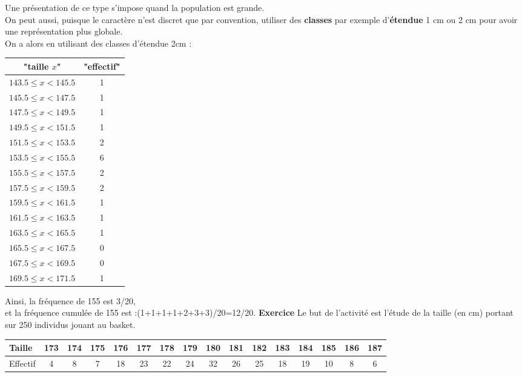 \documentclass[a4paper,11pt]{book}
\begin{document}
Une pr\'esentation de ce type s'impose quand la population est grande.\\
On peut aussi, puisque le caract\`ere n'est discret que par convention, 
utiliser des {\bf classes} par exemple d'{\bf \'etendue}  1 cm ou 2 cm pour 
avoir une repr\'esentation plus globale.\\ 
On a alors en utilisant des classes d'\'etendue 2cm :\\
\begin{center}
\begin{tabular}{|c|c|}
\hline
"taille $x$"&"effectif"\\
\hline
$143.5 \leq x< 145.5$&1\\
$145.5 \leq x <147.5$&1\\
$147.5 \leq x <149.5$&1\\
$149.5 \leq x <151.5$&1\\
$151.5 \leq x <153.5$&2\\
$153.5 \leq x <155.5$&6\\
$155.5 \leq x <157.5$&2\\
$157.5 \leq x <159.5$&2\\
$159.5 \leq x <161.5$&1\\
$161.5 \leq x <163.5$&1\\
$163.5 \leq x <165.5$&1\\
$165.5 \leq x <167.5$&0\\
$167.5 \leq x <169.5$&0\\
$169.5 \leq x <171.5$&1\\
\hline
\end{tabular}
\end{center}
Ainsi, la fr\'equence de 155 est 3/20,\\
 et la fr\'equence cumul\'ee de 155 est :(1+1+1+1+2+3+3)/20=12/20. 
{\bf Exercice}
Le but de l’activité est l'étude de la taille (en cm) portant sur 250 
individus jouant au basket.\\
\begin{tabular}{|p{1cm}|*{15}{c|}}
\hline
Taille & 173 & 174 & 175 & 176 & 177 & 178 & 179 & 180 & 181 & 182 & 183  &184 & 185 & 186 & 187\\
\hline
Effectif   &  4  &8  &7  &18 & 23  &22 & 24 & 32 & 26 & 25 & 18 & 19 & 10 & 8 & 6\\
\hline
\end{tabular}
\end{document}
